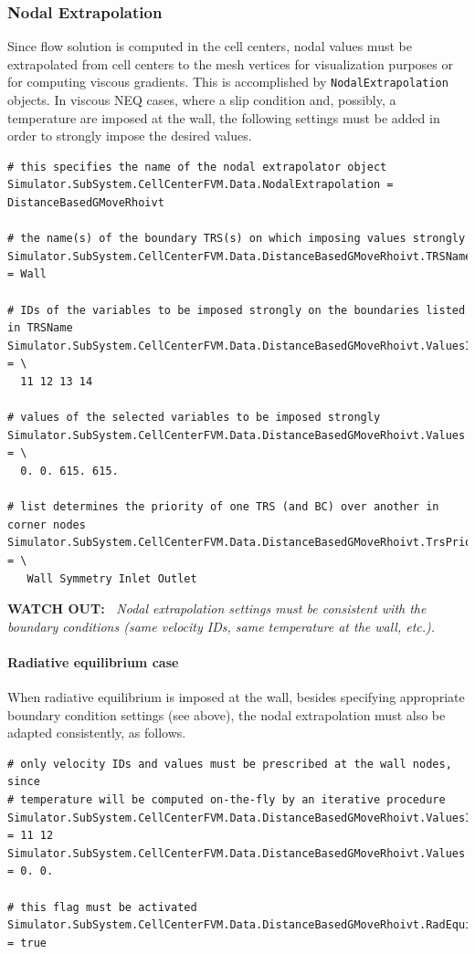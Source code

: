 \documentclass[11pt]{article}
\begin{document}
\subsubsection{Nodal Extrapolation}

Since flow solution is computed in the cell centers, nodal values must be extrapolated from cell centers 
to the mesh vertices for visualization purposes or for computing viscous gradients. This is accomplished by 
{\tt NodalExtrapolation} objects. In viscous NEQ cases, where a slip condition and, possibly, a temperature 
are imposed at the wall, the following settings must be added in order to strongly impose the desired values.

\begin{verbatim}
# this specifies the name of the nodal extrapolator object
Simulator.SubSystem.CellCenterFVM.Data.NodalExtrapolation = DistanceBasedGMoveRhoivt

# the name(s) of the boundary TRS(s) on which imposing values strongly 
Simulator.SubSystem.CellCenterFVM.Data.DistanceBasedGMoveRhoivt.TRSName = Wall

# IDs of the variables to be imposed strongly on the boundaries listed in TRSName
Simulator.SubSystem.CellCenterFVM.Data.DistanceBasedGMoveRhoivt.ValuesIdx = \
  11 12 13 14

# values of the selected variables to be imposed strongly
Simulator.SubSystem.CellCenterFVM.Data.DistanceBasedGMoveRhoivt.Values = \
  0. 0. 615. 615.

# list determines the priority of one TRS (and BC) over another in corner nodes
Simulator.SubSystem.CellCenterFVM.Data.DistanceBasedGMoveRhoivt.TrsPriorityList = \
   Wall Symmetry Inlet Outlet
\end{verbatim}

{\bf WATCH OUT:~} {\it Nodal extrapolation settings must be consistent with the boundary conditions (same velocity IDs, same temperature at the wall, etc.).}

\paragraph{Radiative equilibrium case}

When radiative equilibrium is imposed at the wall, besides specifying appropriate boundary condition settings (see above),
the nodal extrapolation must also be adapted consistently, as follows.

\begin{verbatim}
# only velocity IDs and values must be prescribed at the wall nodes, since 
# temperature will be computed on-the-fly by an iterative procedure  
Simulator.SubSystem.CellCenterFVM.Data.DistanceBasedGMoveRhoivt.ValuesIdx = 11 12 
Simulator.SubSystem.CellCenterFVM.Data.DistanceBasedGMoveRhoivt.Values = 0. 0.

# this flag must be activated
Simulator.SubSystem.CellCenterFVM.Data.DistanceBasedGMoveRhoivt.RadEquilibrium = true
\end{verbatim}
\end{document}
